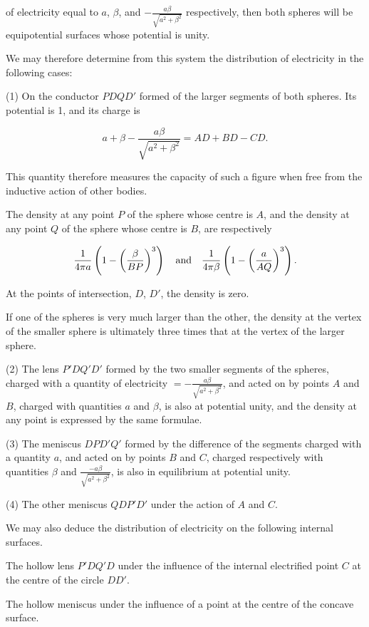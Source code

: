 \documentclass[11pt,a4paper]{article}
\begin{document}
of electricity equal to $a$, $\beta$, and
$-\frac{a\beta}{\sqrt{a^2+\beta^2}}$ respectively, then both spheres
will be equipotential surfaces whose potential is unity.

We may therefore determine from this system the distribution of electricity in the following cases:

(1) On the conductor $PDQD'$ formed of the larger segments of both
spheres. Its potential is 1, and its charge is

\[
a+\beta-\frac{a\beta}{\sqrt{a^2+\beta^2}}=AD+BD-CD.
\]

This quantity therefore measures the capacity of such a figure when free from the inductive action of other bodies.

The density at any point $P$ of the sphere whose centre is $A$, and
the density at any point $Q$ of the sphere whose centre is $B$, are
respectively

\[
\frac{1}{4\pi a}\left(1-\left(\frac{\beta}{BP}\right)^3\right)
\quad\hbox{and}\quad
\frac{1}{4\pi\beta}\left(1-\left(\frac{a}{AQ}\right)^3\right).
\]

At the points of intersection, $D$, $D'$, the density is zero.

If one of the spheres is very much larger than the other, the density
at the vertex of the smaller sphere is ultimately three times that at
the vertex of the larger sphere.

(2) The lens $P'DQ'D'$ formed by the two smaller segments of the
spheres, charged with a quantity of electricity
$=-\frac{a\beta}{\sqrt{a^2+\beta^2}}$, and acted on by points $A$ and
$B$, charged with quantities $a$ and $\beta$, is also at potential
unity, and the density at any point is expressed by the same formulae.

(3) The meniscus $DPD'Q'$ formed by the difference of the segments
charged with a quantity $a$, and acted on by points $B$ and $C$,
charged respectively with quantities $\beta$ and
$\frac{-a\beta}{\sqrt{a^2+\beta^2}}$, is also in equilibrium at
potential unity.

(4) The other meniscus $QDP'D'$ under the action of $A$ and $C$.

We may also deduce the distribution of electricity on the following internal surfaces.

The hollow lens $P'DQ'D$ under the influence of the internal
electrified point $C$ at the centre of the circle $DD'$.

The hollow meniscus under the influence of a point at the centre of the concave surface.
\end{document}
